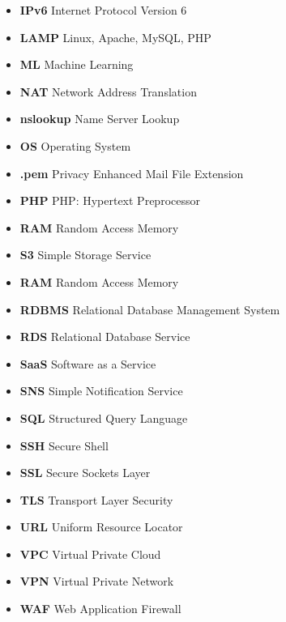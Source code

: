 \begin{itemize}
    \item  \textbf{IPv6} \textemdash Internet Protocol Version 6
    \item  \textbf{LAMP} \textemdash Linux, Apache, MySQL, PHP
    \item  \textbf{ML} \textemdash Machine Learning
    \item  \textbf{NAT} \textemdash Network Address Translation
    \item  \textbf{nslookup} \textemdash Name Server Lookup
    \item  \textbf{OS} \textemdash Operating System
    \item  \textbf{.pem} \textemdash Privacy Enhanced Mail File Extension
    \item  \textbf{PHP} \textemdash PHP: Hypertext Preprocessor
    \item  \textbf{RAM} \textemdash Random Access Memory
    \item  \textbf{S3} \textemdash Simple Storage Service
    \item  \textbf{RAM} \textemdash Random Access Memory
    \item  \textbf{RDBMS} \textemdash Relational Database Management System
    \item  \textbf{RDS} \textemdash Relational Database Service
    \item  \textbf{SaaS} \textemdash Software as a Service
    \item  \textbf{SNS} \textemdash Simple Notification Service
    \item  \textbf{SQL} \textemdash Structured Query Language
    \item  \textbf{SSH} \textemdash Secure Shell
    \item  \textbf{SSL} \textemdash Secure Sockets Layer
    \item  \textbf{TLS} \textemdash Transport Layer Security
    \item  \textbf{URL} \textemdash Uniform Resource Locator
    \item  \textbf{VPC} \textemdash Virtual Private Cloud
    \item  \textbf{VPN} \textemdash Virtual Private Network
    \item  \textbf{WAF} \textemdash Web Application Firewall
\end{itemize}
